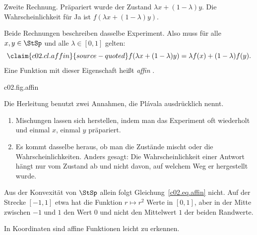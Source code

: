 Zweite Rechnung. Präpariert wurde der Zustand $\lambda x + (1-\lambda) y$. Die
Wahrscheinlichkeit für Ja ist $f(\lambda x + (1-\lambda) y)$.

Beide Rechnungen beschreiben dasselbe Experiment. Also muss für alle $x, y \in \StSp$ und
alle $\lambda \in [0,1]$ gelten:
\begin{equation}\label{c02.eq.affin}\claim{c02.cl.affin}{source-quoted}
  f(\lambda x + (1-\lambda) y) = \lambda f(x) + (1-\lambda) f(y) .
\end{equation}
Eine Funktion mit dieser Eigenschaft heißt \emph{affin}
.

\begin{tpcfigure}{c02.fig.affin}
  \caption{Die Zustände mischen oder die Wahrscheinlichkeiten mischen. Waagerecht ist die Strecke zwischen zwei Zuständen aufgetragen, senkrecht die Wahrscheinlichkeit für Ja. (a) Eine affine Funktion: Ihr Graph ist eine Gerade. In der Mischung $z = \tfrac14 x + \tfrac34 y$ hat sie den Wert $\tfrac14\cdot\tfrac14 + \tfrac34\cdot\tfrac34 = \tfrac58$, dieselbe Mischung der beiden Randwerte. (b) Die Funktion $r \mapsto r^2$ auf $[-1,1]$: Das Mittel der Randwerte ist $1$, der Wert in der Mitte ist $0$. Eine solche Funktion kann keine Ja-Nein-Frage beschreiben.}
\end{tpcfigure}

\begin{greybox}
  Die Herleitung benutzt zwei Annahmen, die Plávala ausdrücklich nennt.
  \begin{enumerate}
    \item Mischungen lassen sich herstellen, indem man das Experiment oft wiederholt und
      einmal $x$, einmal $y$ präpariert.
    \item Es kommt dasselbe heraus, ob man die Zustände mischt oder die
      Wahrscheinlichkeiten. Anders gesagt: Die Wahrscheinlichkeit einer Antwort hängt nur
      vom Zustand ab und nicht davon, auf welchem Weg er hergestellt wurde.
  \end{enumerate}
  Aus der Konvexität von $\StSp$ allein folgt Gleichung~\eqref{c02.eq.affin} nicht. Auf
  der Strecke $[-1,1]$ etwa hat die Funktion $r \mapsto r^2$ Werte in $[0,1]$, aber in der
  Mitte zwischen $-1$ und $1$ den Wert $0$ und nicht den Mittelwert $1$ der beiden
  Randwerte.
\end{greybox}


In Koordinaten sind affine Funktionen leicht zu erkennen.

